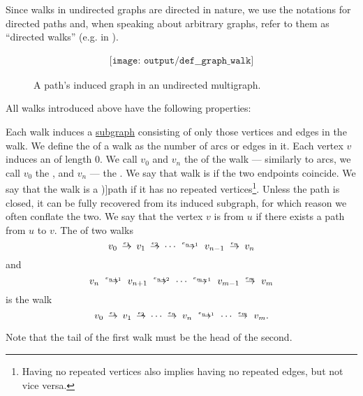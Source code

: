 \begin{definition}
\begin{thmenum}[series=def:graph_walk]
    Since walks in undirected graphs are directed in nature, we use the notations for directed paths and, when speaking about arbitrary graphs, refer to them as \enquote{directed walks} (e.g. in ).
  \end{thmenum}

  \begin{figure}[!ht]
    \begin{equation}\label{eq:fig:def:graph_walk}
      \begin{aligned}
        \texttt{[image: output/def\_\_graph\_walk]}
      \end{aligned}
    \end{equation}
    \caption{A path's induced graph in an undirected multigraph.}\label{fig:def:graph_walk}
  \end{figure}

  All walks introduced above have the following properties:
  \begin{thmenum}[resume=def:graph_walk]
     Each walk induces a \hyperref[def:directed_multigraph/subgraph]{subgraph} consisting of only those vertices and edges in the walk.
     We define the  of a walk as the number of arcs or edges in it.
     Each vertex \( v \) induces an  of length \( 0 \).
     We call \( v_0 \) and \( v_n \) the  of the walk --- similarly to arcs, we call \( v_0 \) the , and \( v_n \) --- the .
     We say that walk is  if the two endpoints coincide.
     We say that the walk is a \term[ru=путь (\cite[def. 1.1.15]{Карпов2017})]{path} if it has no repeated vertices\footnote{Having no repeated vertices also implies having no repeated edges, but not vice versa.}. Unless the path is closed, it can be fully recovered from its induced subgraph, for which reason we often conflate the two.
     We say that the vertex \( v \) is  from \( u \) if there exists a path from \( u \) to \( v \).
     The  of two walks
    \begin{equation*}
      v_0 \reloset {e_1} \to v_1 \reloset {e_2} \to \cdots \reloset {e_{n-1}} \to v_{n-1} \reloset {e_n} \to v_n
    \end{equation*}
    and
    \begin{equation*}
      v_n \reloset {e_{n+1}} \to v_{n+1} \reloset {e_{n+2}} \to \cdots \reloset {e_{m-1}} \to v_{m-1} \reloset {e_m} \to v_m
    \end{equation*}
    is the walk
    \begin{equation*}
      v_0 \reloset {e_1} \to v_1 \reloset {e_2} \to \cdots \reloset {e_n} \to v_n \reloset {e_{n+1}} \to \cdots \reloset {e_m} \to v_m.
    \end{equation*}

    Note that the tail of the first walk must be the head of the second.
  \end{thmenum}
\end{definition}
